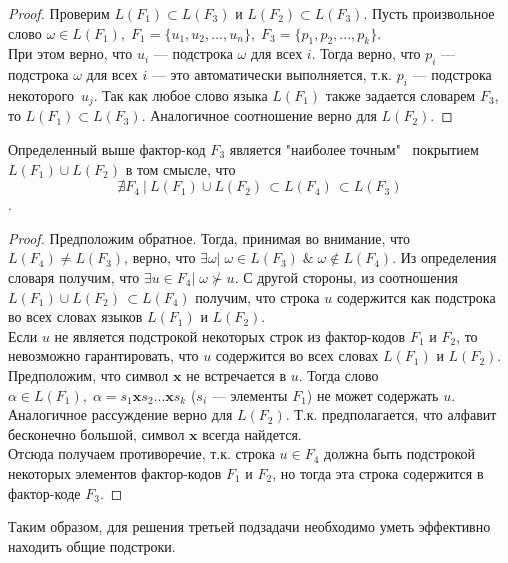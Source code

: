 \documentclass[14pt, russian]{scrartcl}
\begin{document}
\begin{proof}
    Проверим $L(F_1) \subset L(F_3)$ и $L(F_2) \subset L(F_3)$.
    Пусть произвольное слово $\omega \in L(F_1), \; F_1 = \{ u_1, u_2, ..., u_n\}, \; 
    F_3 = \{p_1, p_2, ..., p_k\}$.
    \\
    При этом верно, что $u_i$ --- подстрока $\omega$ для всех $i$. Тогда верно, что $p_i$ --- подстрока $\omega$ для всех $i$ --- это автоматически выполняется, т.к. $p_i$ --- подстрока некоторого~$u_j$. 
    Так как любое слово языка $L(F_1)$ также задается словарем $F_3$, то 
    $L(F_1) \subset L(F_3)$. Аналогичное соотношение верно для $L(F_2)$.
\end{proof}

\begin{Statement}
    Определенный выше фактор-код $F_3$ является "наиболее точным" \, покрытием
    $L(F_1) \cup L(F_2) $
    в том смысле, что 
    $$ \nexists F_4\ | \ L(F_1) \cup L(F_2) \, \subset L(F_4) \, \subset L(F_3)$$.
\end{Statement}

\begin{proof}
    Предположим обратное. Тогда, принимая во внимание, что $L(F_4) \neq L(F_3)$, верно, что $\exists \omega | \; \omega \in L(F_3) \; \& \; \omega \notin L(F_4)$. Из определения словаря получим, что $\exists u \in F_4 | \; \omega \not \succ u$. С другой стороны, из соотношения
    $ L(F_1) \cup L(F_2) \, \subset L(F_4) $ получим, что строка $u$ содержится как подстрока во всех словах языков $L(F_1)$ и $L(F_2)$.
    \\
    Если $u$ не является подстрокой  некоторых строк из фактор-кодов $F_1$ и $F_2$, то невозможно гарантировать, что $u$ содержится во всех словах $L(F_1)$ и $L(F_2)$. Предположим, что символ $\textbf{x}$ не встречается в $u$. Тогда слово $\alpha \in L(F_1), \; \alpha = s_1\textbf{x}s_2...\textbf{x}s_k$ ($s_i$ --- элементы $F_1$) не может содержать $u$. Аналогичное рассуждение верно для $L(F_2)$. Т.к. предполагается, что алфавит бесконечно большой, символ $\textbf{x}$ всегда найдется.
    \\
    Отсюда получаем противоречие, т.к. строка $u \in F_4$ должна быть подстрокой некоторых элементов фактор-кодов $F_1$ и $F_2$, но тогда эта строка содержится в фактор-коде $F_3$.
\end{proof}


Таким образом, для решения третьей подзадачи необходимо уметь эффективно находить общие подстроки.
\end{document}
